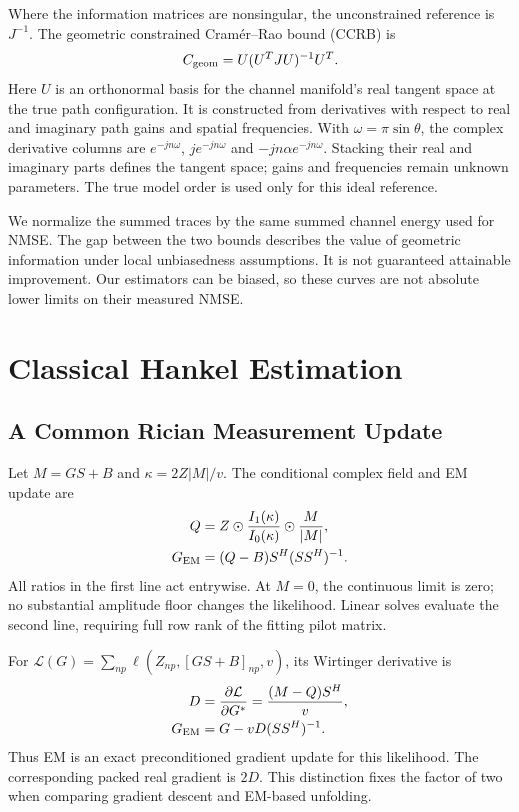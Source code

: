 \documentclass[10pt,journal,letterpaper]{IEEEtran}
\begin{document}
Where the information matrices are nonsingular, the unconstrained reference is $J^{-1}$. The geometric constrained Cram\'er--Rao bound (CCRB) is~\cite{stoica1998}
\begin{equation}
 C_{\rm geom}=U(U^TJU)^{-1}U^T.
 \label{eq:ccrb}
\end{equation}
Here $U$ is an orthonormal basis for the channel manifold's real tangent space at the true path configuration. It is constructed from derivatives with respect to real and imaginary path gains and spatial frequencies. With $\omega=\pi\sin\theta$, the complex derivative columns are $e^{-jn\omega}$, $je^{-jn\omega}$ and $-jn\alpha e^{-jn\omega}$. Stacking their real and imaginary parts defines the tangent space; gains and frequencies remain unknown parameters. The true model order is used only for this ideal reference.

We normalize the summed traces by the same summed channel energy used for NMSE. The gap between the two bounds describes the value of geometric information under local unbiasedness assumptions. It is not guaranteed attainable improvement. Our estimators can be biased, so these curves are not absolute lower limits on their measured NMSE.

\section{Classical Hankel Estimation}
\label{sec:classical}
\subsection{A Common Rician Measurement Update}
Let $M=GS+B$ and $\kappa=2Z|M|/v$. The conditional complex field and EM update are
\begin{align}
 Q&=Z\odot\frac{I_1(\kappa)}{I_0(\kappa)}\odot\frac{M}{|M|},\\
 G_{\rm EM}&=(Q-B)S^H(SS^H)^{-1}.
 \label{eq:em}
\end{align}
All ratios in the first line act entrywise. At $M=0$, the continuous limit is zero; no substantial amplitude floor changes the likelihood. Linear solves evaluate the second line, requiring full row rank of the fitting pilot matrix.

For $\mathcal L(G)=\sum_{np}\ell(Z_{np},[GS+B]_{np},v)$, its Wirtinger derivative is
\begin{align}
 D&=\frac{\partial\mathcal L}{\partial G^*}=\frac{(M-Q)S^H}{v},\nonumber\\
 G_{\rm EM}&=G-vD(SS^H)^{-1}.
 \label{eq:gradient}
\end{align}
Thus EM is an exact preconditioned gradient update for this likelihood. The corresponding packed real gradient is $2D$. This distinction fixes the factor of two when comparing gradient descent and EM-based unfolding.
\end{document}
